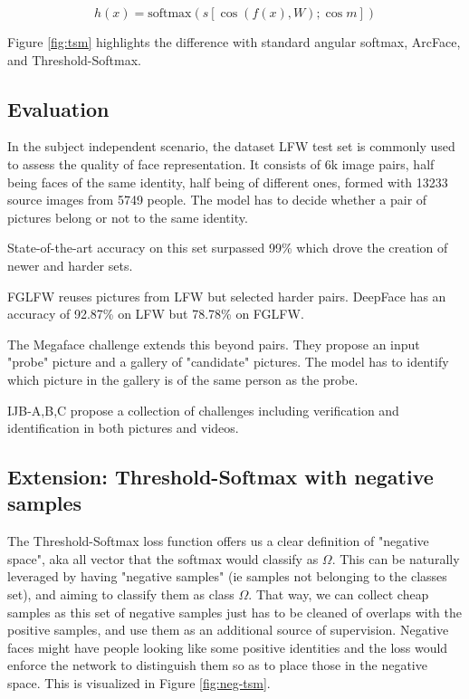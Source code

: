 \begin{equation}
    h(x) = \text{softmax}(s [\cos(f(x),W); \cos m])
\end{equation}

Figure \ref{fig:tsm} highlights the difference with standard angular softmax, ArcFace, and Threshold-Softmax.

\subsection{Evaluation}

In the subject independent scenario, the dataset LFW \citep{lfw} test set is commonly used to assess the quality of face representation. It consists of 6k image pairs, half being faces of the same identity, half being of different ones, formed with 13233 source images from 5749 people. The model has to decide whether a pair of pictures belong or not to the same identity.

State-of-the-art accuracy on this set surpassed 99\% which drove the creation of newer and harder sets.

FGLFW \citep{fglfw} reuses pictures from LFW but selected harder pairs. DeepFace \cite{deepface} has an accuracy of 92.87\% on LFW but 78.78\% on FGLFW.

The Megaface challenge \citep{megaface} extends this beyond pairs. They propose an input "probe" picture and a gallery of "candidate" pictures. The model has to identify which picture in the gallery is of the same person as the probe.

IJB-{A,B,C} propose a collection of challenges including verification and identification in both pictures and videos.


\subsection{Extension: Threshold-Softmax with negative samples}

The Threshold-Softmax loss function offers us a clear definition of "negative space", aka all vector that the softmax would classify as $\Omega$. This can be naturally leveraged by having "negative samples" (ie samples not belonging to the classes set), and aiming to classify them as class $\Omega$. That way, we can collect cheap samples as this set of negative samples just has to be cleaned of overlaps with the positive samples, and use them as an additional source of supervision. Negative faces might have people looking like some positive identities and the loss would enforce the network to distinguish them so as to place those in the negative space. This is visualized in Figure \ref{fig:neg-tsm}.

